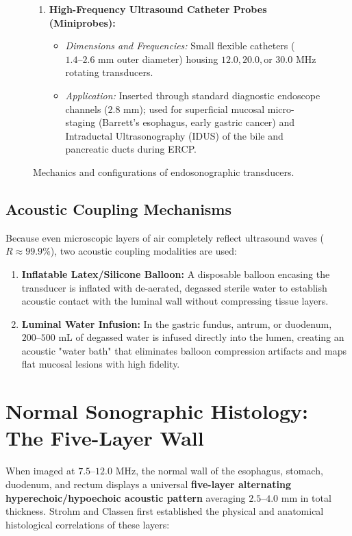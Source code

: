\documentclass[11pt,a4paper]{article}
\begin{document}
\begin{figure}[htbp]
\begin{tcolorbox}[colback=blue!5!white,colframe=blue!60!black,title=\textbf{Architectural Taxonomy: Radial vs. Linear Echoendoscopes},width=\linewidth]
\begin{enumerate}[leftmargin=1.5em]
\begin{itemize}
    \end{itemize}
    \item \textbf{High-Frequency Ultrasound Catheter Probes (Miniprobes):}
    \begin{itemize}
        \item \textit{Dimensions and Frequencies:} Small flexible catheters ($1.4\text{--}2.6\text{ mm}$ outer diameter) housing $12.0, 20.0, \text{or } 30.0\text{ MHz}$ rotating transducers.
        \item \textit{Application:} Inserted through standard diagnostic endoscope channels ($2.8\text{ mm}$); used for superficial mucosal micro-staging (Barrett's esophagus, early gastric cancer) and Intraductal Ultrasonography (IDUS) of the bile and pancreatic ducts during ERCP.
    \end{itemize}
\end{enumerate}
\end{tcolorbox}
\caption{Mechanics and configurations of endosonographic transducers.}
\label{fig:transducer_types}
\end{figure}

\subsection{Acoustic Coupling Mechanisms}
Because even microscopic layers of air completely reflect ultrasound waves ($R \approx 99.9\%$), two acoustic coupling modalities are used:
\begin{enumerate}
    \item \textbf{Inflatable Latex/Silicone Balloon:} A disposable balloon encasing the transducer is inflated with de-aerated, degassed sterile water to establish acoustic contact with the luminal wall without compressing tissue layers.
    \item \textbf{Luminal Water Infusion:} In the gastric fundus, antrum, or duodenum, $200\text{--}500\text{ mL}$ of degassed water is infused directly into the lumen, creating an acoustic "water bath" that eliminates balloon compression artifacts and maps flat mucosal lesions with high fidelity.
\end{enumerate}

\section{Normal Sonographic Histology: The Five-Layer Wall}
When imaged at $7.5\text{--}12.0\text{ MHz}$, the normal wall of the esophagus, stomach, duodenum, and rectum displays a universal \textbf{five-layer alternating hyperechoic/hypoechoic acoustic pattern} averaging $2.5\text{--}4.0\text{ mm}$ in total thickness. Strohm and Classen first established the physical and anatomical histological correlations of these layers:
\end{document}
